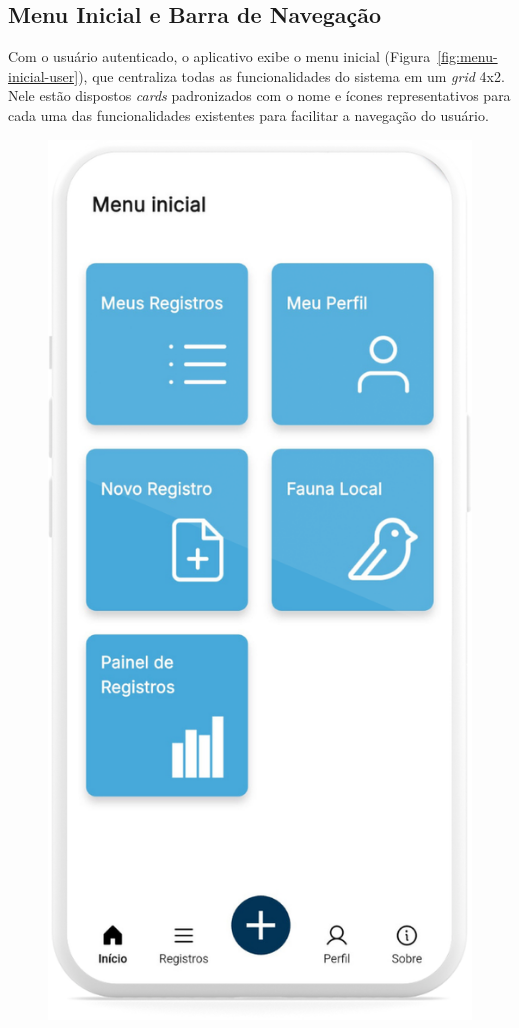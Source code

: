 \subsection{Menu Inicial e Barra de Navegação}
Com o usuário autenticado, o aplicativo exibe o menu inicial (Figura~\ref{fig:menu-inicial-user}),
que centraliza todas as funcionalidades do sistema em um \textit{grid} 4x2. Nele estão dispostos \textit{cards} 
padronizados com o nome e ícones representativos para cada uma das funcionalidades existentes para facilitar a 
navegação do usuário. 

\begin{figure}[H]
    \centering
    \begin{minipage}[t]{0.48\textwidth}
        \centering
        \includegraphics[height=0.72\textheight]{imagens/sistema/device_frame/menuCidadao.png}

\end{minipage}
\end{figure}
